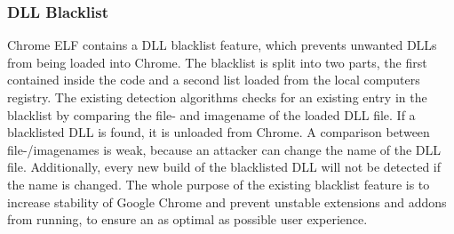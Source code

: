 \subsubsection{DLL Blacklist}
Chrome ELF contains a DLL blacklist feature, which prevents unwanted DLLs from being loaded into Chrome. The blacklist is split into two parts, the first contained inside the code and a second list loaded from the local computers registry. The existing detection algorithms checks for an existing entry in the blacklist by comparing the file- and imagename of the loaded DLL file. If a blacklisted DLL is found, it is unloaded from Chrome. A comparison between file-/imagenames is  weak, because an attacker can change the name of the DLL file. Additionally, every new build of the blacklisted DLL will not be detected if the name is changed. The whole purpose of the existing blacklist feature is to increase stability of Google Chrome and prevent unstable extensions and addons from running, to ensure an as optimal as possible user experience.